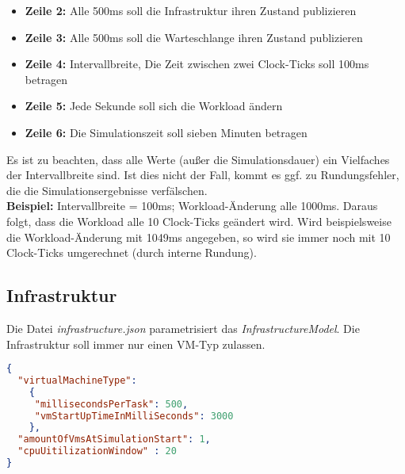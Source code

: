 \begin{itemize}
	\item \textbf{Zeile 2:} Alle 500ms soll die Infrastruktur ihren Zustand publizieren
	\item \textbf{Zeile 3:} Alle 500ms soll die Warteschlange ihren Zustand publizieren
	\item \textbf{Zeile 4:} Intervallbreite, Die Zeit zwischen zwei Clock-Ticks soll 100ms betragen 
	\item \textbf{Zeile 5:} Jede Sekunde soll sich die Workload ändern
	\item \textbf{Zeile 6:} Die Simulationszeit soll sieben Minuten betragen
	
\end{itemize}
\noindent
Es ist zu beachten, dass alle Werte (außer die Simulationsdauer) ein Vielfaches der Intervallbreite sind. Ist dies nicht der Fall, kommt es ggf. zu Rundungsfehler, die die Simulationsergebnisse verfälschen. \\
 \textbf{Beispiel:} Intervallbreite = 100ms; Workload-Änderung alle 1000ms. Daraus folgt, dass die Workload alle 10 Clock-Ticks geändert wird. Wird beispielsweise die Workload-Änderung mit 1049ms angegeben, so wird sie immer noch mit 10 Clock-Ticks umgerechnet (durch interne Rundung).
 


\subsection{Infrastruktur}
\label{sec:konfiguration:infrastruktur}
Die Datei \textit{infrastructure.json} parametrisiert das \textit{InfrastructureModel}. Die Infrastruktur soll immer nur einen VM-Typ zulassen. 
\begin{lstlisting}[language=json,firstnumber=1, caption={infrastructure.json}]
{
  "virtualMachineType": 
    {
     "millisecondsPerTask": 500,
     "vmStartUpTimeInMilliSeconds": 3000
    },
  "amountOfVmsAtSimulationStart": 1,
  "cpuUitilizationWindow" : 20
}
\end{lstlisting}


